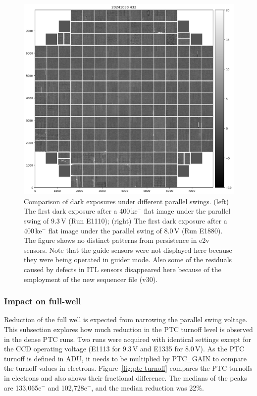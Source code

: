 \begin{figure}[ht]
\begin{minipage}[b]{0.45\textwidth}
\includegraphics[width=\textwidth]{figures/E1880dp80.png}
\end{minipage}
\caption{Comparison of dark exposures under different parallel swings. (left) The first dark exposure after a 400\,ke$^-$ flat image under the parallel swing of 9.3\,V (Run E1110); (right) The first dark exposure after a 400\,ke$^-$ flat image under the parallel swing of 8.0\,V (Run E1880). The figure shows no distinct patterns from persistence in e2v sensors. Note that the guide sensors were not displayed here because they were being operated in guider mode. Also some of the residuals caused by defects in ITL sensors disappeared here because of the employment of the new sequencer file (v30).}
\label{fig:persistence-reduction}
\end{figure}



\subsubsection{Impact on full-well}\label{impact-on-full-well}

Reduction of the full well is expected from narrowing the parallel swing
voltage. This subsection explores how much reduction in the PTC turnoff level
is observed in the dense PTC runs. Two runs were acquired with identical
settings except for the CCD operating voltage (E1113 for 9.3\,V and E1335
for 8.0\,V). As the PTC turnoff is defined in ADU, it needs to be
multiplied by PTC\_GAIN to compare the turnoff values in electrons.
Figure~\ref{fig:ptc-turnoff} compares the PTC turnoffs in electrons and also shows their
fractional difference. The medians of the peaks are 133,065e$^-$ and 102,728e$^-$, and the median reduction was 22\%.

